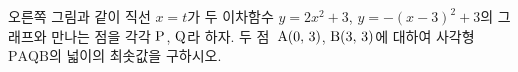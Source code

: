 \noindent\begin{minipage}[t]{0.58\linewidth}\vspace{0pt}\raggedright 오른쪽 그림과 같이 직선 $x=t$가 두 이차함수 $y=2x^2+3$, $y=-(x-3)^2+3$의 그래프와 만나는 점을 각각 $\mathrm{P}$, $\mathrm{Q}$라 하자. 두 점~$\mathrm{A}(0,\,3)$, $\mathrm{B}(3,\,3)$에 대하여 사각형 $\mathrm{PAQB}$의 넓이의 최솟값을 구하시오. \end{minipage}\hfill\begin{minipage}[t]{0.4\linewidth}\vspace{0pt}\centering \resizebox{\ifdim\width>\linewidth\linewidth\else\width\fi}{!}{}\end{minipage}\par
